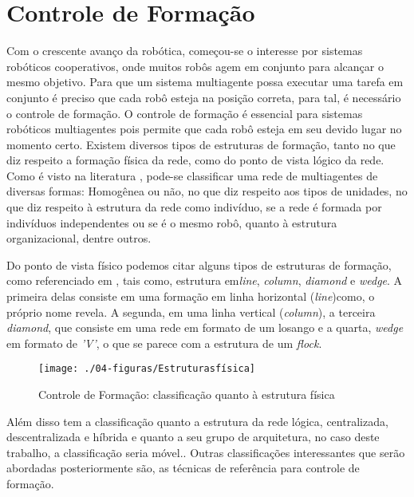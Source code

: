 \section{Controle de Formação}
\label{sec:controleFormacao}
Com o crescente avanço da robótica, começou-se o interesse por sistemas robóticos cooperativos, onde muitos robôs agem em conjunto para alcançar o mesmo objetivo. Para que um sistema multiagente possa executar uma tarefa em conjunto é preciso que cada robô esteja na posição correta, para tal, é necessário o controle de formação. O controle de formação é essencial para sistemas robóticos multiagentes pois permite que cada robô esteja em seu devido lugar no momento certo. Existem diversos tipos de estruturas de formação, tanto no que diz respeito a formação física da rede, como do ponto de vista lógico da rede. Como é visto na literatura \cite{leal2009reconfigurable}, pode-se classificar uma rede de multiagentes de diversas formas: Homogênea ou não, no que diz respeito aos tipos de unidades, no que diz respeito à estrutura da rede como indivíduo, se a rede é formada por indivíduos independentes ou se é o mesmo robô, quanto à estrutura organizacional, dentre outros. 

Do ponto de vista físico podemos citar alguns tipos de estruturas de formação, como referenciado em , tais como, estrutura em\emph{line}, \emph{column}, \emph{diamond} e \emph{wedge}. A primeira delas consiste em uma formação em linha horizontal (\emph{line})como, o próprio nome revela. A segunda, em uma linha vertical (\emph{column}), a terceira \emph{diamond}, que consiste em uma rede em formato de um losango e a quarta, \emph{wedge} em formato de \emph{'V'}, o que se parece com a estrutura de um \emph{flock}. 

\begin{figure}[!htb]
	\centering
	\caption{Controle de Formação: classificação quanto à estrutura física}
	\texttt{[image: ./04-figuras/Estruturasfísica]}
	\label{fig:est_fis}
\end{figure}

Além disso tem a classificação quanto a estrutura da rede lógica, centralizada, descentralizada e híbrida e quanto a seu grupo de arquitetura, no caso deste trabalho, a classificação seria móvel.\cite{leal2009reconfigurable}. Outras classificações interessantes que serão abordadas posteriormente são, as técnicas de referência para controle de formação.

